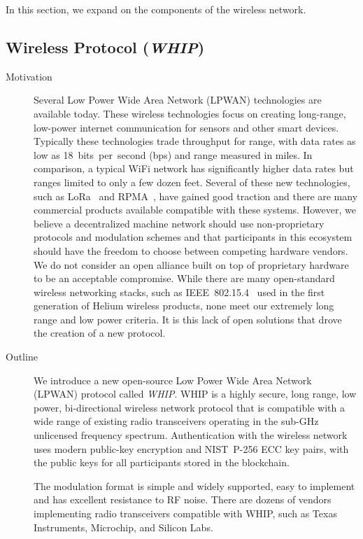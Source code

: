 \documentclass[10pt, nonatbib, nocopyrightspace, reprint]{sigplanconf}
\begin{document}
In this section, we expand on the components of the wireless network.

\subsection{Wireless Protocol (\emph{WHIP})}\label{whip}

\begin{description}
    \item [Motivation] Several Low Power Wide Area Network (LPWAN) technologies are available today. These wireless technologies focus on creating long-range, low-power internet communication for sensors and other smart devices. Typically these technologies trade throughput for range, with data rates as low as 18~bits~per~second (bps) and range measured in miles. In comparison, a typical WiFi network has significantly higher data rates but ranges limited to only a few dozen feet. Several of these new technologies, such as LoRa~\cite{lora} and RPMA~\cite{rpma}, have gained good traction and there are many commercial products available compatible with these systems. However, we believe a decentralized machine network should use non-proprietary protocols and modulation schemes and that participants in this ecosystem should have the freedom to choose between competing hardware vendors. We do not consider an open alliance built on top of proprietary hardware to be an acceptable compromise. While there are many open-standard wireless networking stacks, such as IEEE~802.15.4~\cite{ieee802_15_4} used in the first generation of Helium wireless products, none meet our extremely long range and low power criteria. It is this lack of open solutions that drove the creation of a new protocol.

    \item [Outline] We introduce a new open-source Low Power Wide Area Network (LPWAN) protocol called \emph{WHIP}. WHIP is a highly secure, long range, low power, bi-directional wireless network protocol that is compatible with a wide range of existing radio transceivers operating in the sub-GHz unlicensed frequency spectrum. Authentication with the wireless network uses modern public-key encryption and NIST~P-256 ECC key pairs, with the public keys for all participants stored in the blockchain.

    The modulation format is simple and widely supported, easy to implement and has excellent resistance to RF noise. There are dozens of vendors implementing radio transceivers compatible with WHIP, such as Texas Instruments, Microchip, and Silicon Labs.


\end{description}
\end{document}
